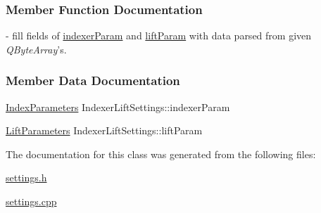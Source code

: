 \subsubsection{Member Function Documentation}
\mbox{\label{classIndexerLiftSettings_ade953aea43325531e7889e71d45d6e65}}  - fill fields of \hyperlink{classIndexerLiftSettings_a09875fa890744d5de30f06b2d580bb24}{indexer\+Param} and \hyperlink{classIndexerLiftSettings_ae9649b8642d20d02892fc4abaad687f7}{lift\+Param} with data parsed from given \mbox{\textit{Q\+Byte\+Array}'s}.

\subsubsection{Member Data Documentation}
\mbox{\label{classIndexerLiftSettings_a09875fa890744d5de30f06b2d580bb24}} 
{\footnotesize\ttfamily \mbox{\hyperlink{classIndexerLiftSettings_a6b75f15b6abc72b9070642cb8b5408ca}{Index\+Parameters}} Indexer\+Lift\+Settings\+::\texorpdfstring{indexer\+Param}{indexerParam}}

\mbox{\label{classIndexerLiftSettings_ae9649b8642d20d02892fc4abaad687f7}} 
{\footnotesize\ttfamily \mbox{\hyperlink{classIndexerLiftSettings_a83fd6fc58021bc526b681c1ce840f686}{Lift\+Parameters}} Indexer\+Lift\+Settings\+::\texorpdfstring{lift\+Param}{liftParam}}


The documentation for this class was generated from the following files\+:\begin{DoxyCompactItemize}
\item 
\mbox{\hyperlink{settings_8h}{settings.\+h}}\item 
\mbox{\hyperlink{settings_8cpp}{settings.\+cpp}}\end{DoxyCompactItemize}
\newpage
